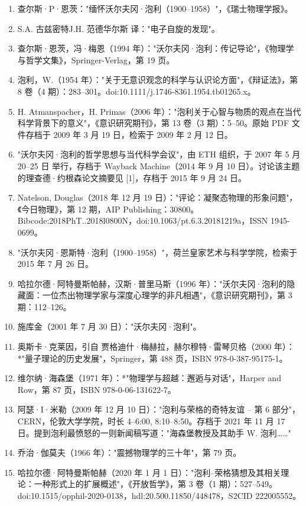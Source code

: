 \begin{enumerate}
\item 查尔斯·P·恩茨："缅怀沃尔夫冈·泡利（1900–1958）"，《瑞士物理学报》。  
\item S.A. 古兹密特J.H. 范德华尔斯 译："电子自旋的发现"。  
\item 查尔斯·恩茨，冯·梅恩（1994 年）："沃尔夫冈·泡利：传记导论"，《物理学与哲学文集》，Springer-Verlag，第 19 页。  
\item 泡利，W.（1954 年）："关于无意识观念的科学与认识论方面"，《辩证法》，第 8 卷（4 期）：283–301。doi:10.1111/j.1746-8361.1954.tb01265.x。  
\item H. Atmanspacher，H. Primas（2006 年）："泡利关于心智与物质的观点在当代科学背景下的意义"，《意识研究期刊》，第 13 卷（3 期）：5–50。原始 PDF 文件存档于 2009 年 3 月 19 日，检索于 2009 年 2 月 12 日。  
\item "沃尔夫冈·泡利的哲学思想与当代科学会议"，由 ETH 组织，于 2007 年 5 月 20–25 日 举行，存档于 Wayback Machine（2014 年 9 月 10 日）。讨论该主题的理查德·约根森论文摘要见 [1]，存档于 2015 年 9 月 24 日。
\item Natelson, Douglas（2018 年 12 月 19 日）："评论：凝聚态物理的形象问题"，《今日物理》，第 12 期，AIP Publishing：30800。Bibcode:2018PhT..2018l0800N，doi:10.1063/pt.6.3.20181219a，ISSN 1945-0699。  
\item "沃尔夫冈·恩斯特·泡利（1900–1958）"，荷兰皇家艺术与科学学院，检索于 2015 年 7 月 26 日。  
\item 哈拉尔德·阿特曼斯帕赫，汉斯·普里马斯（1996 年）："沃尔夫冈·泡利的隐藏面：一位杰出物理学家与深度心理学的非凡相遇"，《意识研究期刊》，第 3 期：112–126。  
\item 施库金（2001 年 7 月 30 日）："沃尔夫冈·泡利"。  
\item 奥斯卡·克莱因，引自 贾格迪什·梅赫拉，赫尔穆特·雷琴贝格（2000 年）：*"量子理论的历史发展"，Springer，第 488 页，ISBN 978-0-387-95175-1。  
\item 维尔纳·海森堡（1971 年）：*"物理学与超越：邂逅与对话"，Harper and Row，第 87 页，ISBN 978-0-06-131622-7。  
\item 阿瑟·I·米勒（2009 年 12 月 10 日）："泡利与荣格的奇特友谊 – 第 6 部分"，CERN，伦敦大学学院，时长 4–6:00, 8:10–8:50。存档于 2021 年 11 月 17 日。提到泡利最愤怒的一则新闻稿写道："海森堡教授及其助手 W. 泡利……"  
\item 乔治·伽莫夫（1966 年）："震撼物理学的三十年"，第 79 页。  
\item 哈拉尔德·阿特曼斯帕赫（2020 年 1 月 1 日）："泡利–荣格猜想及其相关理论：一种形式上的扩展概述"，《开放哲学》，第 3 卷（1 期）：527–549。doi:10.1515/opphil-2020-0138，hdl:20.500.11850/448478，S2CID 222005552。

\end{enumerate}
